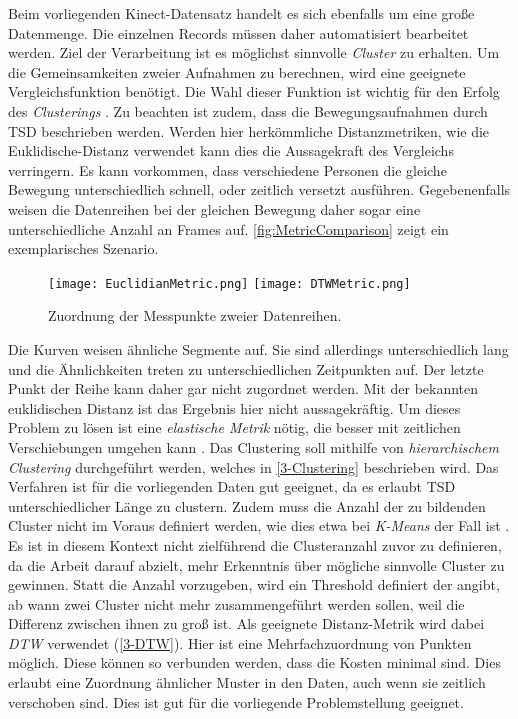 Beim vorliegenden Kinect-Datensatz handelt es sich ebenfalls um eine große Datenmenge.
Die einzelnen Records müssen daher automatisiert bearbeitet werden.
Ziel der Verarbeitung ist es möglichst sinnvolle \emph{Cluster} zu erhalten.
Um die Gemeinsamkeiten zweier Aufnahmen zu berechnen,
wird eine geeignete Vergleichsfunktion benötigt.
Die Wahl dieser Funktion ist wichtig für den Erfolg des \emph{Clusterings} \citep{warren_liao_clustering_2005}.
Zu beachten ist zudem, dass die Bewegungsaufnahmen durch \ac{TSD} beschrieben werden.
Werden hier herkömmliche Distanzmetriken, wie die Euklidische-Distanz verwendet
kann dies die Aussagekraft des Vergleichs verringern.
Es kann vorkommen, dass verschiedene Personen die gleiche Bewegung unterschiedlich schnell,
oder zeitlich versetzt ausführen.
Gegebenenfalls weisen die Datenreihen bei der gleichen Bewegung daher sogar eine unterschiedliche Anzahl an Frames auf.
\autoref{fig:MetricComparison} zeigt ein exemplarisches Szenario.
\begin{figure}[ht]
    \begin{center}
    \texttt{[image: EuclidianMetric.png]}
    \texttt{[image: DTWMetric.png]}
    \end{center}
    \caption{Zuordnung der Messpunkte zweier Datenreihen.}
    \label{fig:MetricComparison}
\end{figure}
Die Kurven weisen ähnliche Segmente auf.
Sie sind allerdings unterschiedlich lang und die Ähnlichkeiten treten zu unterschiedlichen Zeitpunkten auf.
Der letzte Punkt der Reihe kann daher gar nicht zugordnet werden.
Mit der bekannten euklidischen Distanz ist das Ergebnis hier nicht aussagekräftig.
Um dieses Problem zu lösen ist eine \emph{elastische Metrik} nötig,
die besser mit zeitlichen Verschiebungen umgehen kann \citep{aghabozorgi_time-series_2015}.
Das Clustering soll mithilfe von \emph{hierarchischem Clustering} durchgeführt werden,
welches in \autoref{3-Clustering} beschrieben wird.
Das Verfahren ist für die vorliegenden Daten gut geeignet,
da es erlaubt \ac{TSD} unterschiedlicher Länge zu clustern.
Zudem muss die Anzahl der zu bildenden Cluster nicht im Voraus definiert werden,
wie dies etwa bei \emph{K-Means} der Fall ist \citep{aghabozorgi_time-series_2015}.
Es ist in diesem Kontext nicht zielführend die Clusteranzahl zuvor zu definieren,
da die Arbeit darauf abzielt, mehr Erkenntnis über mögliche sinnvolle Cluster zu gewinnen.
Statt die Anzahl vorzugeben, wird ein Threshold definiert der angibt,
ab wann zwei Cluster nicht mehr zusammengeführt werden sollen,
weil die Differenz zwischen ihnen zu groß ist.
Als geeignete Distanz-Metrik wird dabei \emph{\ac{DTW}} verwendet (\autoref{3-DTW}).
Hier ist eine Mehrfachzuordnung von Punkten möglich.
Diese können so verbunden werden, dass die Kosten minimal sind.
Dies erlaubt eine Zuordnung ähnlicher Muster in den Daten, auch wenn sie zeitlich verschoben sind.
Dies ist gut für die vorliegende Problemstellung geeignet.